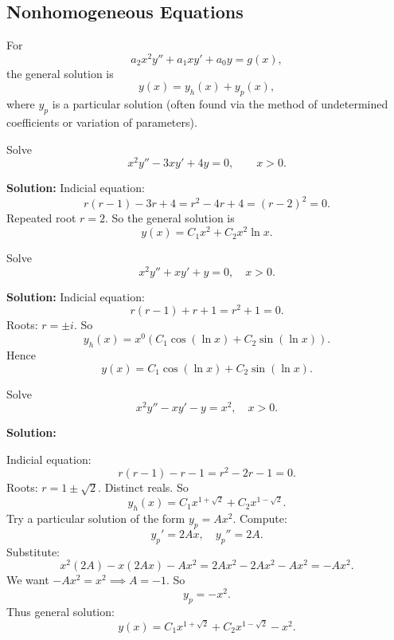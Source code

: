   \subsection{Nonhomogeneous Equations}
    For
    \[
    a_2 x^2 y'' + a_1 x y' + a_0 y = g(x),
    \]
    the general solution is
    \[
    y(x) = y_h(x) + y_p(x),
    \]
    where $y_p$ is a particular solution (often found via the method of undetermined coefficients or variation of parameters).


    \begin{example}
      Solve
      \[
      x^2 y'' - 3x y' + 4y = 0, \qquad x>0.
      \]

      \textbf{Solution:}  
      Indicial equation:
      \[
      r(r-1) - 3r + 4 = r^2 - 4r + 4 = (r-2)^2=0.
      \]
      Repeated root $r=2$.  
      So the general solution is
      \[
      \boxed{y(x) = C_1 x^2 + C_2 x^2 \ln x.}
      \]
    \end{example}

    \begin{example}
      Solve
      \[
      x^2 y'' + x y' + y = 0, \quad x>0.
      \]

      \textbf{Solution:}  
      Indicial equation:
      \[
      r(r-1) + r + 1 = r^2+1=0.
      \]
      Roots: $r=\pm i$.  
      So
      \[
      y_h(x) = x^0 \left( C_1 \cos(\ln x) + C_2 \sin(\ln x) \right).
      \]
      Hence
      \[
      \boxed{y(x)= C_1 \cos(\ln x) + C_2 \sin(\ln x).}
      \]
    \end{example}

    \begin{example}
      Solve
      \[
      x^2 y'' - x y' - y = x^2, \quad x>0.
      \]

      \textbf{Solution:} 

      Indicial equation:
      \[
      r(r-1) - r -1 = r^2 - 2r -1=0.
      \]
      Roots: $r=1\pm \sqrt{2}$. Distinct reals.  
      So
      \[
      y_h(x) = C_1 x^{1+\sqrt{2}} + C_2 x^{1-\sqrt{2}}.
      \]
      Try a particular solution of the form $y_p = A x^2$.  
      Compute:
      \[
      y_p' = 2Ax,\quad y_p''=2A.
      \]
      Substitute:
      \[
      x^2(2A) - x(2Ax) - Ax^2 = 2Ax^2 - 2Ax^2 - Ax^2 = -Ax^2.
      \]
      We want $-Ax^2 = x^2 \implies A=-1$.  
      So
      \[
      y_p = -x^2.
      \]
      Thus general solution:
      \[
      \boxed{y(x)=C_1 x^{1+\sqrt{2}} + C_2 x^{1-\sqrt{2}} - x^2.}
      \]
    \end{example}




